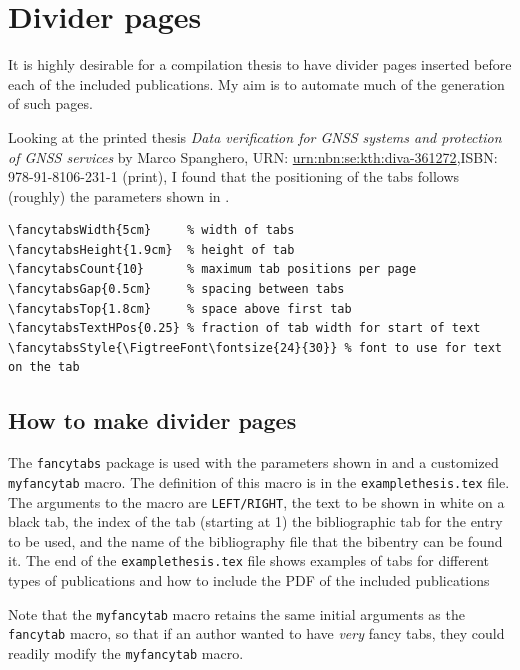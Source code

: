 \documentclass[12pt, twoside]{article}
\begin{document}
\section{Divider pages}
\label{sec:cycle3DividerPages}

It is highly desirable for a compilation thesis to have divider pages inserted before each of the included publications. My aim is to automate much of the generation of such pages.

Looking at the printed thesis \textit{Data verification for GNSS systems and protection of GNSS services} by Marco Spanghero,  URN: \href{https://urn.kb.se/resolve?urn=urn%3Anbn%3Ase%3Akth%3Adiva-361272}{urn:nbn:se:kth:diva-361272},ISBN: 978-91-8106-231-1 (print), I found that the positioning of the tabs follows (roughly) the parameters shown in \Cref{lst:myfaancytabParameters}.

\begin{lstlisting}[style=latexExampleForAuthors, caption={Parameters used with myfancytab macro}, label=lst:myfaancytabParameters]
\fancytabsWidth{5cm}     % width of tabs
\fancytabsHeight{1.9cm}  % height of tab
\fancytabsCount{10}      % maximum tab positions per page
\fancytabsGap{0.5cm}     % spacing between tabs
\fancytabsTop{1.8cm}     % space above first tab
\fancytabsTextHPos{0.25} % fraction of tab width for start of text
\fancytabsStyle{\FigtreeFont\fontsize{24}{30}} % font to use for text on the tab
\end{lstlisting}

\subsection{How to make divider pages}
\label{sec:cycle3HowToMakeDividerPages}


The \texttt{fancytabs} package is used with the parameters shown in 
and a customized \texttt{myfancytab} macro. The definition of this macro is in the \texttt{examplethesis.tex} file. The arguments to the macro are \texttt{LEFT/RIGHT}, the text to be shown in white on a black tab, the index of the tab (starting at 1) the bibliographic tab for the entry to be used, and the name of the bibliography file that the bibentry can be found it. The end of the \texttt{examplethesis.tex} file shows examples of tabs for different types of publications and how to include the PDF of the included publications

Note that the \texttt{myfancytab} macro retains the same initial arguments as the \texttt{fancytab} macro, so that if an author wanted to have \textit{very} fancy tabs, they could readily modify the \texttt{myfancytab} macro.
\end{document}
